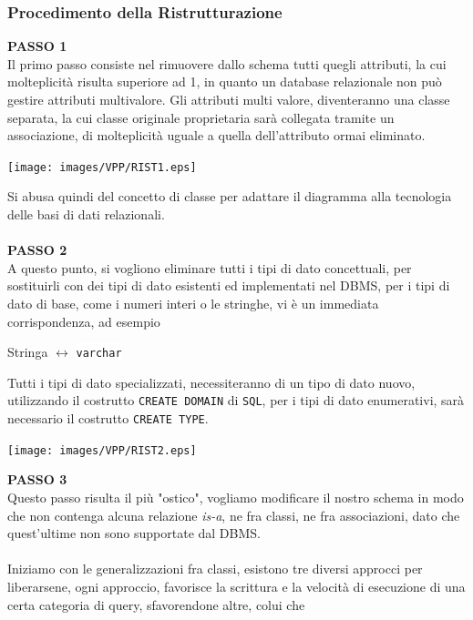 \documentclass[12pt, letterpaper]{article}
\newcommand{\code}[1]{\colorbox{light-gray}{\texttt{#1}}}
\newcommand{\codee}[1]{\colorbox{white}{\texttt{#1}}}
\newcommand{\acc}{\\\hphantom{}\\}
\begin{document}
\subsubsection{Procedimento della Ristrutturazione}
{\large \textbf{PASSO 1}}\\ 
Il primo passo consiste nel rimuovere dallo schema tutti quegli attributi, la cui molteplicità risulta 
superiore ad 1, in quanto un database relazionale non può gestire attributi multivalore. Gli attributi multi valore, 
diventeranno una classe separata, la cui classe originale proprietaria sarà collegata tramite un associazione, di 
molteplicità uguale a quella dell'attributo ormai eliminato.\begin{center}
    \texttt{[image: images/VPP/RIST1.eps]}
\end{center}
Si abusa quindi del concetto di classe per adattare il diagramma alla tecnologia delle basi di 
dati relazionali.\acc 
{\large \textbf{PASSO 2}}\\ 
A questo punto, si vogliono eliminare tutti i tipi di dato concettuali, per sostituirli con dei tipi di dato 
esistenti ed implementati nel DBMS, per i tipi di dato di base, come i numeri interi o le stringhe, vi 
è un immediata corrispondenza, ad esempio\begin{center}
    Stringa $\longleftrightarrow $ \codee{varchar}
\end{center}
Tutti i tipi di dato specializzati, necessiteranno di un tipo di dato nuovo, utilizzando il costrutto \code{CREATE DOMAIN} di 
\codee{SQL}, per i tipi di dato enumerativi, sarà necessario il costrutto \code{CREATE TYPE}.\begin{center}
    \texttt{[image: images/VPP/RIST2.eps]}
\end{center}
{\large \textbf{PASSO 3}}\\ 
Questo passo risulta il più "ostico", vogliamo modificare il nostro schema in modo che non contenga alcuna 
relazione \textit{is-a}, ne fra classi, ne fra associazioni, dato che quest'ultime non sono supportate 
dal DBMS.\acc 
Iniziamo con le generalizzazioni fra classi, esistono tre diversi approcci per liberarsene, ogni approccio, 
favorisce la scrittura e la velocità di esecuzione di una certa categoria di query, sfavorendone altre, colui che 
\end{document}
